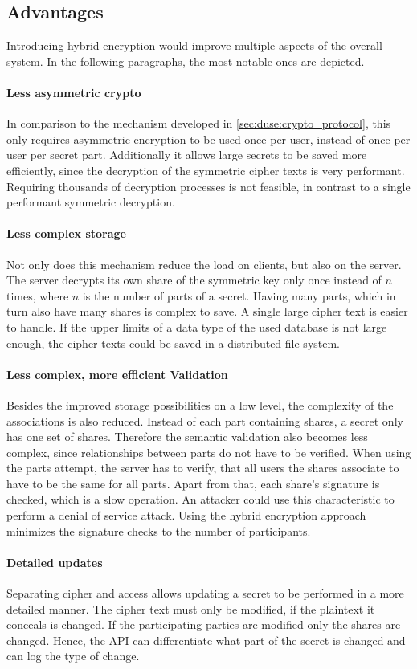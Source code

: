 \subsection{Advantages}

Introducing hybrid encryption would improve multiple aspects of the overall
system. In the following paragraphs, the most notable ones are depicted.

\paragraph{Less asymmetric crypto}{ In comparison to the mechanism developed in
  \ref{sec:duse:crypto_protocol}, this only requires asymmetric encryption to
  be used once per user, instead of once per user per secret part. Additionally
  it allows large secrets to be saved more efficiently, since the decryption of
the symmetric cipher texts is very performant. Requiring thousands of
decryption processes is not feasible, in contrast to a single performant
symmetric decryption.}

\paragraph{Less complex storage}{ Not only does this mechanism reduce the load
  on clients, but also on the server. The server decrypts its own share of the
  symmetric key only once instead of $n$ times, where $n$ is the number of
  parts of a secret.  Having many parts, which in turn also have many shares is
complex to save. A single large cipher text is easier to handle. If the upper
limits of a data type of the used database is not large enough, the cipher
texts could be saved in a distributed file system.}

\paragraph{Less complex, more efficient Validation}{ Besides the improved
  storage possibilities on a low level, the complexity of the associations is
  also reduced. Instead of each part containing shares, a secret only has one
  set of shares.  Therefore the semantic validation also becomes less complex,
  since relationships between parts do not have to be verified. When using the
  parts attempt, the server has to verify, that all users the shares associate
  to have to be the same for all parts. Apart from that, each share's signature
  is checked, which is a slow operation. An attacker could use this
characteristic to perform a denial of service attack. Using the hybrid
encryption approach minimizes the signature checks to the number of
participants. }

\paragraph{Detailed updates}{ Separating cipher and access allows updating a
  secret to be performed in a more detailed manner. The cipher text must only
  be modified, if the plaintext it conceals is changed. If the participating
  parties are modified only the shares are changed. Hence, the API can
differentiate what part of the secret is changed and can log the type of
change. }
